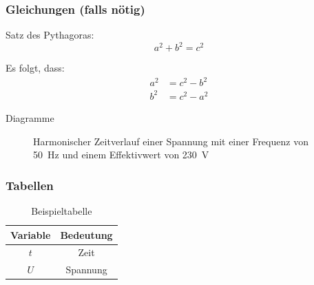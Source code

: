 \documentclass{beamer}
\begin{document}
\begin{frame}
	\frametitle<presentation>{Gleichungen (falls nötig)}
	\begin{block}{Satz des Pythagoras:}
		\begin{equation}
			a^2 + b^2 = c^2 \label{eq:pythogoras}
		\end{equation}	\end{block}
	\begin{block}{Es folgt, dass:}
		\begin{align}
			a^2 &= c^2 - b^2 \\
			b^2 &= c^2 - a^2
		\end{align} 	
 	\end{block}
\end{frame}

\begin{frame}{Diagramme}
	\begin{figure}
		\centering
		\caption{Harmonischer Zeitverlauf einer Spannung mit einer Frequenz von \SI{50}{\hertz} und einem Effektivwert von \SI{230}{\volt}}
		\label{fig:u_t_sinus}
	\end{figure}
\end{frame}

\begin{frame}
	\frametitle<presentation>{Tabellen}
	\begin{table}
		\caption{Beispieltabelle}
		\label{tab:beispiel}
		\centering
			\begin{tabular}{cc}
				\toprule
				Variable & Bedeutung \\
				\midrule
				$t$ & Zeit \\
				$U$ & Spannung \\
				\bottomrule
			\end{tabular}
	\end{table}
\end{frame}
\end{document}
